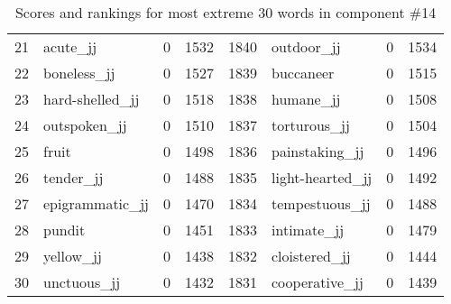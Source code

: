 \begin{table}[tbp]
\begin{tabular}{| rlr@{.}l | rlr@{.}l |}
    21 & acute\_jj & 0 & 1532    &    1840 & outdoor\_jj & 0 & 1534 \\
    22 & boneless\_jj & 0 & 1527    &    1839 & buccaneer & 0 & 1515 \\
    23 & hard-shelled\_jj & 0 & 1518    &    1838 & humane\_jj & 0 & 1508 \\
    24 & outspoken\_jj & 0 & 1510    &    1837 & torturous\_jj & 0 & 1504 \\
    25 & fruit & 0 & 1498    &    1836 & painstaking\_jj & 0 & 1496 \\
    26 & tender\_jj & 0 & 1488    &    1835 & light-hearted\_jj & 0 & 1492 \\
    27 & epigrammatic\_jj & 0 & 1470    &    1834 & tempestuous\_jj & 0 & 1488 \\
    28 & pundit & 0 & 1451    &    1833 & intimate\_jj & 0 & 1479 \\
    29 & yellow\_jj & 0 & 1438    &    1832 & cloistered\_jj & 0 & 1444 \\
    30 & unctuous\_jj & 0 & 1432    &    1831 & cooperative\_jj & 0 & 1439 \\
    \hline
    \end{tabular}
    \caption{Scores and rankings for most extreme 30 words in component \#14} 
\end{table}
\clearpage

